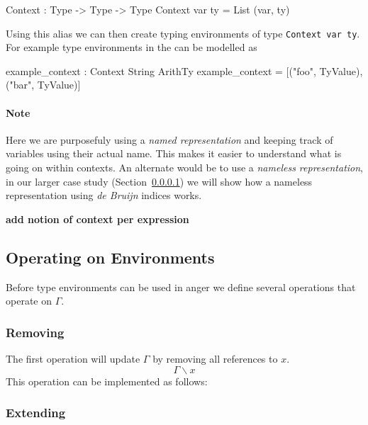 \begin{code}
Context : Type -> Type -> Type
Context var ty = List (var, ty)
\end{code}

\noindent
Using this alias we can then create typing environments of type \texttt{Context var ty}.
For example type environments in the \allang{} can be modelled as

\begin{code}
example_context : Context String ArithTy
example_context = [("foo", TyValue), ("bar", TyValue)]
\end{code}

\paragraph{Note} Here we are purposefuly using a \emph{named representation} and keeping track of variables using their actual name.
This makes it easier to understand what is going on within contexts.
An alternate would be to use a \emph{nameless representation}, in our larger case study (Section~\ref{}) we will show how a nameless representation using \emph{de Bruijn} indices works.


\begin{center}\bfseries
add notion of context per expression
\end{center}

\subsection{Operating on Environments}
\label{sec:type:env-operations}

Before type environments can be used in anger we define several operations that operate on $\Gamma$.

\subsubsection{Removing}
\label{sec:type:env-operations:remove}

The first operation will update $\Gamma$ by removing all references to $x$.
\[
\Gamma\backslash x
\]
\noindent
This operation can be implemented as follows:

\subsubsection{Extending}
\label{sec:type:env-operations:extend}

